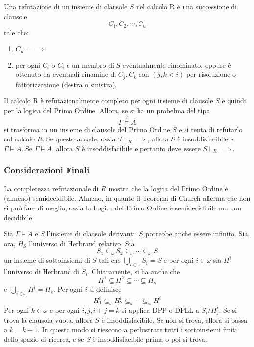 Una refutazione di un insieme di clausole $S$ nel calcolo R è una successione 
di clausole 
$$
C_1, C_2, \cdots, C_u
$$
tale che: 
\begin{enumerate}
        \item $C_u = \implies$
        \item per ogni $C_i$ o $C_i$ è un membro di $S$ eventualmente 
                rinominato, oppure è ottenuto da eventuali rinomine di $C_j, C_k$
                con $(j,k < i)$ per risoluzione o fattorizzazione (destra o sinistra).
\end{enumerate}
Il calcolo R è refutazionalmente completo per ogni insieme di clausole $S$ e quindi 
per la logica del Primo Ordine. Allora, 
se si ha un probelma del tipo 
$$
\Gamma \stackrel{?}{\models} A
$$
si trasforma in un insieme di clausole del Primo Ordine $S$ e si tenta 
di refutarlo col calcolo $R$. Se questo accade, ossia $S \vdash_R \implies$, 
allora $S$ è insoddisfacibile e $\Gamma \models A$. Se $\Gamma \models A$, 
allora $S$ è insoddisfacibile e pertanto deve essere $S \vdash_R \implies$. 


\subsubsection{Considerazioni Finali}
La completezza refutazionale di $R$ mostra che la logica del Primo Ordine è 
(almeno) semidecidibile. Almeno, in quanto il Teorema di Church afferma che non si può 
fare di meglio, ossia la Logica del Primo Ordine è semidecidibile ma non decidibile. 

Sia $\Gamma \models A$ e $S$ l'insieme di clausole derivanti. $S$ potrebbe 
anche essere infinito. Sia, ora, $H_S$ l'universo di Herbrand relativo. 
Sia 
$$
S_1 \subseteq_{\omega} S_2 \subseteq_{\omega} \cdots \subseteq_{\omega}S
$$
un insieme di sottoinsiemi di $S$ tali che $\bigcup_{i \in \omega} S_i = S$ 
e per ogni $i \in \omega$ sia $H^i$ l'universo di Herbrand di $S_i$. Chiaramente, 
si ha anche che 
$$
H^1 \subseteq H^2 \subseteq \cdots \subseteq H_s
$$
e $\bigcup_{i \in \omega} H^i = H_s$. Per ogni $i$ si definisce 
$$
H_1^i \subseteq_{\omega} H_2^i \subseteq_{\omega}\cdots \subseteq_{\omega} H^i
$$
Per ogni $k \in \omega$ e per ogni $i,j, i+j = k$ si applica DPP o DPLL a $S_i/H_j^i$. 
Se si trova la clausola vuota, allora $S$ è insoddisfacibile. Se non si trova, 
allora si passa a $k=k+1$. In questo modo si riescono a perlustrare tutti i sottoinsiemi 
finiti dello spazio di ricerca, e se $S$ è insoddisfacibile prima o poi si trova. 

